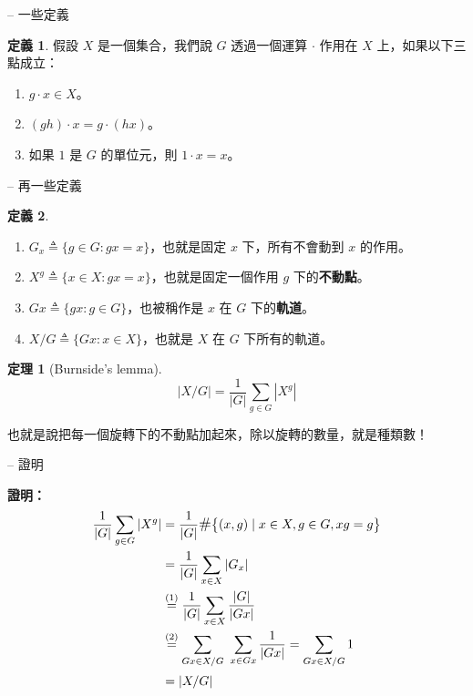 \documentclass[notheorems,xcolor=dvipsnames]{beamer}
\newcommand\abs[1]{\left\lvert #1 \right\rvert}
\newcommand*{\defeq}{\triangleq}
\renewcommand*{\sharp}{\mathlarger{\#}}
\theoremstyle{definition}
\newtheorem{theorem}{定理}
\newtheorem{definition}{定義}
\renewenvironment{proof}{%
\begin{tcolorbox}[frame empty] {\bf 證明：}\ }{\end{tcolorbox}}
\renewcommand*{\emph}[1]{{\bf #1}}
\begin{document}
\begin{frame}{{\secname} -- 一些定義}
\begin{definition}
假設 $X$ 是一個集合，我們說 $G$ 透過一個運算 $\cdot$ 作用在 $X$ 上，如果以下三點成立：\pause
\begin{enumerate}[<+->]
  \item $g \cdot x \in X$。
  \item $(gh) \cdot x = g \cdot (hx)$。
  \item 如果 $1$ 是 $G$ 的單位元，則 $1 \cdot x = x$。
\end{enumerate}
\end{definition}
\end{frame}

\begin{frame}{{\secname} -- 再一些定義}
\begin{definition}
\begin{enumerate}[<+->]
  \item $G_x \defeq \{ g \in G : g x = x \}$，也就是固定 $x$ 下，所有不會動到 $x$ 的作用。
  \item $X^g \defeq \{ x \in X : g x = x \}$，也就是固定一個作用 $g$ 下的\emph{不動點}。
  \item $G x \defeq \{ gx : g \in G \}$，也被稱作是 $x$ 在 $G$ 下的\emph{軌道}。
  \item $X / G \defeq \{ Gx : x \in X \}$，也就是 $X$ 在 $G$ 下所有的軌道。
\end{enumerate}
\end{definition}
\end{frame}

\begin{frame}{{\secname}}
  \begin{theorem}[Burnside's lemma] \vspace{-1em}
  \[ \abs{X / G} = \frac{1}{\abs{G}} \sum_{g \in G} \abs{X^g} \]
  \end{theorem}\pause

  \medskip
  也就是說把每一個旋轉下的不動點加起來，除以旋轉的數量，就是種類數！
\end{frame}

\begin{frame}{{\secname} -- 證明}
  \begin{proof}
  \begin{align*}
   \frac{1}{\abs{G}} \sum_{g \in G} \abs{X^g} &= \frac{1}{\abs{G}}
   \sharp \big\{ (x, g) \mid x \in X, g \in G, x g = g \big\} \\
   &= \frac{1}{\abs{G}} \sum_{x \in X} \abs{G_x} \\
   &\stackrel{(1)}{=} \frac{1}{\abs{G}} \sum_{x \in X} \frac{\abs{G}}{\abs{Gx}}\\
   &\stackrel{(2)}{=} \sum_{Gx \in X / G} \ \sum_{x \in Gx} \frac{1}{\abs{Gx}} = \sum_{Gx \in X/G} 1\\
   &= \abs{X / G}
  \end{align*}
  \end{proof}
\end{frame}
\end{document}
